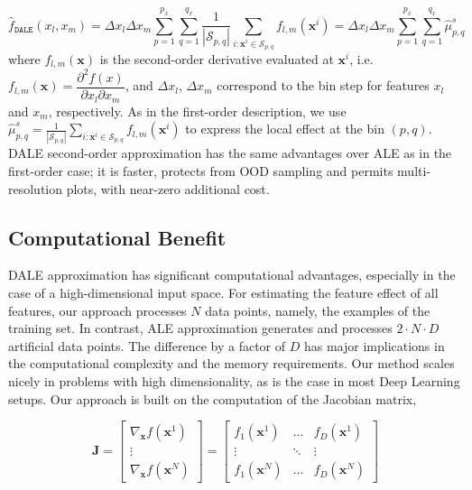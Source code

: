 \documentclass[wcp]{jmlr}
\newcommand{\dale}{\hat{f}_{\mathtt{DALE}}}
\newcommand{\xb}{\mathbf{x}}
\newcommand{\Jac}{\mathbf{J}}
\begin{document}
\begin{equation}
  \dale(x_l, x_m)
  = \Delta x_l \Delta x_m \sum_{p=1}^{p_x} \sum_{q=1}^{q_x}
  \frac{1}{|\mathcal{S}_{p,q}|} \sum_{i:\xb^i \in \mathcal{S}_{p,q}}f_{l,m}(\xb^i)
  = \Delta x_l \Delta x_m \sum_{p=1}^{p_x} \sum_{q=1}^{q_x} \hat{\mu}_{p,q}^s
  \label{eq:DALE-2}
\end{equation}
%
where \( f_{l,m}(\xb) \) is the second-order derivative evaluated at
\(\xb^i\), i.e.
\( f_{l,m}(\xb) = \dfrac{\partial^2f(x)}{\partial x_l \partial x_m}
\), and \(\Delta x_l\), \(\Delta x_m\) correspond to the bin step for
features \(x_l\) and \(x_m\), respectively. As in the first-order
description, we use
\( \hat{\mu}_{p,q}^s = \frac{1}{|\mathcal{S}_{p,q}|} \sum_{i:\xb^i \in
  \mathcal{S}_{p,q}}f_{l,m}(\xb^i)\) to express the local effect at
the bin \( (p, q) \). DALE second-order approximation has the same
advantages over ALE as in the first-order case; it is faster, protects
from OOD sampling and permits multi-resolution plots, with near-zero
additional cost.

\subsection{Computational Benefit}
\label{sec:4-2-computational}

DALE approximation has significant computational advantages,
especially in the case of a high-dimensional input space. For
estimating the feature effect of all features, our approach processes
\(N\) data points, namely, the examples of the training set. In
contrast, ALE approximation generates and processes
\(2 \cdot N \cdot D\) artificial data points. The difference by a
factor of \(D\) has major implications in the computational complexity
and the memory requirements. Our method scales nicely in problems with
high dimensionality, as is the case in most Deep Learning setups. Our
approach is built on the computation of the Jacobian matrix,

\begin{equation} \Jac =
  \begin{bmatrix} \nabla_{\xb}f(\xb^1) \\ \vdots \\ \nabla_{\xb}f(\xb^N)
  \end{bmatrix} =
  \begin{bmatrix} f_1(\xb^1) & \dots & f_D(\xb^1)\\ \vdots & \ddots & \vdots \\ f_1(\xb^N) & \dots & f_D(\xb^N)
  \end{bmatrix}
\label{eq:jacobian}
\end{equation}
\end{document}
